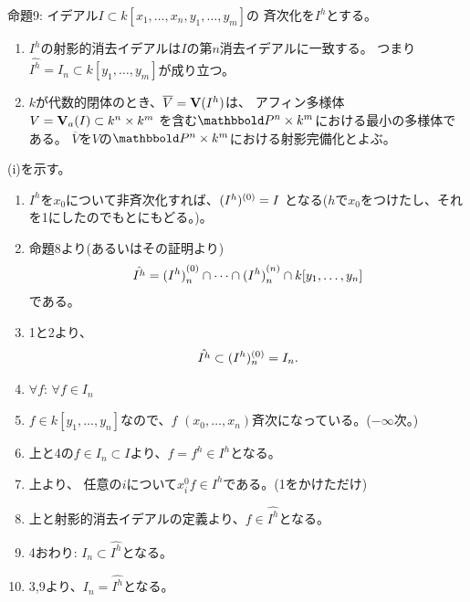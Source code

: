 \begin{framed}
  命題9:
  イデアル$I \subset k[x_1,\dots,x_n,y_1,\dots,y_m] $の
  \xs 斉次化を$I^h$とする。
  \begin{enumerate}[label=(\roman*)]
    \item $I^h$の射影的消去イデアルは$I$の第$n$消去イデアルに一致する。
    つまり$\hat{I^h} = I_n \subset k[y_1,\dots,y_m]$が成り立つ。
    \item
    $k$が代数的閉体のとき、$\overline V= \textbf V(I^h)$は、
    アフィン多様体$V  = \textbf V_a(I) \subset k^n \times k^m$
    を含む$\P^n \times k^m$における最小の多様体である。
    $\overline V$を$V$の$\P^n\times k^m$における射影完備化とよぶ。
  \end{enumerate}
\end{framed}
\begin{myproof}
  (i)を示す。
  \begin{enumerate}
    \item $I^h$を$x_0$について非斉次化すれば、$(I^h)^{(0)} = I$
    となる($h$で$x_0$をつけたし、それを1にしたのでもとにもどる。)。
    \item
    命題8より(あるいはその証明より)
    \begin{align}
      \hat {I^h} = {(I^h)}_n^{(0)} \cap \dots \cap {(I^h)}_n^{(n)} \cap k[y_1,\dots,y_n]
    \end{align}
    である。
    \item 1と2より、
    \begin{align}
      \hat {I^h} \subset (I^h)_n^{(0)} = I_n.
    \end{align}
    \item $\forall f$:
    $\forall f \in I_n$
    \item
    $f\in k[y_1,\dots,y_n]$なので、$f$
    $(x_0,\dots,x_n)$斉次になっている。($-\infty$次。)
    \item
    上と4の$f\in I_n \subset I$より、$f=f^h \in I^h$となる。
    \item
    上より、
    任意の$i$について$x_i^0 f \in I^h$である。(1をかけただけ)
    \item
    上と射影的消去イデアルの定義より、$f\in \hat{I^h}$となる。
    \item 4おわり:
    $I_n \subset \hat{I^h}$となる。
    \item 3,9より、$I_n = \hat{I^h}$となる。
  \end{enumerate}


\end{myproof}
